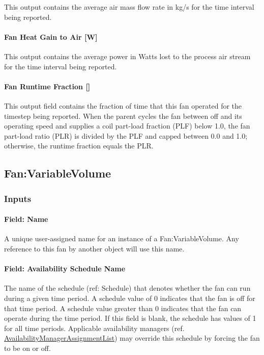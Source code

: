 This output contains the average air mass flow rate in kg/s for the time interval being reported.

\paragraph{Fan Heat Gain to Air {[}W{]}}\label{fan-heat-gain-to-air-w-1}

This output contains the average power in Watts lost to the process air stream for the time interval being reported.

\paragraph{Fan Runtime Fraction {[]}}\label{fan-runtime-fraction}

This output field contains the fraction of time that this fan operated for the timestep being reported. When the parent cycles the fan between off and its operating speed and supplies a coil part-load fraction (PLF) below 1.0, the fan part-load ratio (PLR) is divided by the PLF and capped between 0.0 and 1.0; otherwise, the runtime fraction equals the PLR.

\subsection{Fan:VariableVolume}\label{fanvariablevolume}

\subsubsection{Inputs}\label{inputs-2-016}

\paragraph{Field: Name}\label{field-name-2-015}

A unique user-assigned name for an instance of a Fan:VariableVolume. Any reference to this fan by another object will use this name.

\paragraph{Field: Availability Schedule Name}\label{field-availability-schedule-name-2-002}

The name of the schedule (ref: Schedule) that denotes whether the fan can run during a given time period. A schedule value of 0 indicates that the fan is off for that time period. A schedule value greater than 0 indicates that the fan can operate during the time period. If this field is blank, the schedule has values of 1 for all time periods. Applicable availability managers (ref. \hyperref[availabilitymanagerassignmentlist]{AvailabilityManagerAssignmentList}) may override this schedule by forcing the fan to be on or off.

